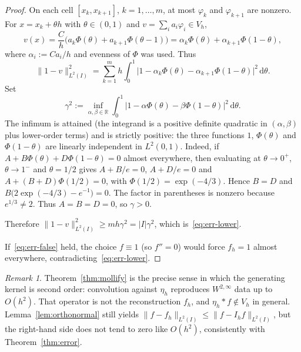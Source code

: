 \documentclass[final,3p,times]{elsarticle}
\theoremstyle{plain}
\theoremstyle{definition}
\theoremstyle{remark}
\newtheorem{remark}[theorem]{Remark}
\newcommand{\dd}{\mathrm{d}}
\begin{document}
\begin{proof}
On each cell $[x_k,x_{k+1}]$, $k=1,\dots,m$, at most $\varphi_k$ and
$\varphi_{k+1}$ are nonzero. For $x=x_k+\theta h$ with $\theta\in(0,1)$
and $v=\sum_i a_i\varphi_i\in V_h$,
\begin{equation}
v(x)
=\frac{C}{h}\bigl(a_k\Phi(\theta)+a_{k+1}\Phi(\theta-1)\bigr)
=\alpha_k\Phi(\theta)+\alpha_{k+1}\Phi(1-\theta),
\end{equation}
where $\alpha_i:=C a_i/h$ and evenness of $\Phi$ was used. Thus
\begin{equation}
\lVert 1-v\rVert_{L^2(I)}^2
=
\sum_{k=1}^{m}
h\int_0^1\bigl\lvert 1-\alpha_k\Phi(\theta)-\alpha_{k+1}\Phi(1-\theta)\bigr\rvert^2
\,\dd\theta.
\end{equation}
Set
\begin{equation}
\gamma^2
:=\inf_{\alpha,\beta\in\mathbb{R}}
\int_0^1\bigl\lvert 1-\alpha\Phi(\theta)-\beta\Phi(1-\theta)\bigr\rvert^2\,\dd\theta.
\end{equation}
The infimum is attained (the integrand is a positive definite quadratic in
$(\alpha,\beta)$ plus lower-order terms) and is strictly positive: the three
functions $1$, $\Phi(\theta)$ and $\Phi(1-\theta)$ are linearly independent in
$L^2(0,1)$. Indeed, if $A+B\Phi(\theta)+D\Phi(1-\theta)=0$ almost everywhere,
then evaluating at $\theta\to 0^+$, $\theta\to 1^-$ and $\theta=1/2$ gives
$A+B/e=0$, $A+D/e=0$ and $A+(B+D)\Phi(1/2)=0$, with
$\Phi(1/2)=\exp(-4/3)$. Hence $B=D$ and
$B\bigl(2\exp(-4/3)-e^{-1}\bigr)=0$. The factor in parentheses is nonzero
because $e^{1/3}\neq 2$. Thus $A=B=D=0$, so $\gamma>0$.

Therefore
$\lVert 1-v\rVert_{L^2(I)}^2\ge m h\gamma^2=\lvert I\rvert\gamma^2$,
which is~\eqref{eq:err-lower}.

If~\eqref{eq:err-false} held, the choice $f\equiv 1$ (so $f''=0$) would force
$f_h=1$ almost everywhere, contradicting~\eqref{eq:err-lower}.
\end{proof}

\begin{remark}
\label{rem:mollify-vs-fh}
Theorem~\ref{thm:mollify} is the precise sense in which the generating kernel
is second order: convolution against $\eta_h$ reproduces $W^{2,\infty}$ data
up to $O(h^2)$. That operator is not the reconstruction $f_h$, and
$\eta_h*f\notin V_h$ in general. Lemma~\ref{lem:orthonormal} still yields
$\lVert f-f_h\rVert_{L^2(I)}\le\lVert f-I_h f\rVert_{L^2(I)}$, but the
right-hand side does not tend to zero like $O(h^2)$, consistently with
Theorem~\ref{thm:error}.
\end{remark}
\end{document}

